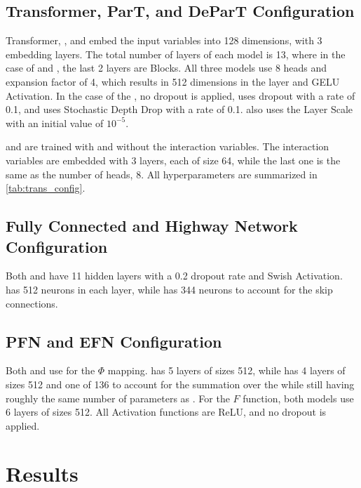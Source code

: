 \subsection{Transformer, ParT, and DeParT Configuration}
\label{sec:transformer_config}

Transformer, \ParT, and \depart embed the input variables into 128 dimensions, with 3 embedding layers.
The total number of layers of each model is 13, where in the case of \depart and \ParT, the last 2 layers are \CA Blocks.
All three models use 8 heads and \FFN expansion factor of 4, which results in 512 dimensions in the \FFN layer and GELU Activation.
In the case of the \trans, no dropout is applied, \ParT uses dropout with a rate of 0.1, and \depart uses Stochastic Depth Drop with a rate of 0.1.
\depart also uses the Layer Scale with an initial value of $10^{-5}$.

\ParT and \depart are trained with and without the interaction variables.
The interaction variables are embedded with 3 layers, each of size 64, while the last one is the same as the number of heads, 8.
All hyperparameters are summarized in \cref{tab:trans_config}.

\subsection{Fully Connected and Highway Network Configuration}
\label{sec:fc_config}

Both \fc and \highway have 11 hidden layers with a 0.2 dropout rate and Swish Activation.
\fc has 512 neurons in each layer, while \highway has 344 neurons to account for the skip connections.

\subsection{PFN and EFN Configuration}
\label{sec:efn_config}

Both \PFN and \EFN use \pointCNN for the $\Phi$ mapping. 
\PFN has 5 layers of sizes 512, while \EFN has 4 layers of sizes 512 and one of 136 to account for the summation over the \PFOs while still having roughly the same number of parameters as \PFN.
For the $F$ function, both models use 6 layers of sizes 512. 
All Activation functions are ReLU, and no dropout is applied.


\section{Results}
\label{sec:results}



